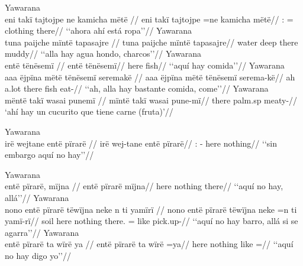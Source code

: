 \documentclass{memoir}
\begin{document}
\pex\label{ex-main-aff-part-nsubj}    \a Yawarana\\
    \label{convcosnoind-48}        \begingl
        \glpreamble eni takï tajtojpe ne kamicha mëtë //
        \gla eni takï tajtojpe =ne kamicha mëtë//
        \glb {}:   = clothing there//
            \glft ‘‘ahora ahí está ropa’’//  
        \endgl 
    \a Yawarana\\
    \label{histgrme-76}        \begingl
        \glpreamble tuna paijche mïntë tapasajre //
        \gla tuna paijche mïntë tapasajre//
        \glb water deep there muddy//
            \glft ‘‘alla hay agua hondo, charcos’’//  
        \endgl 
    \a Yawarana\\
    \label{histgrme-86}        \begingl
        \glpreamble entë tënësemï //
        \gla entë tënësemï//
        \glb here fish//
            \glft ‘‘aquí hay comida’’//  
        \endgl 
    \a Yawarana\\
    \label{histgrme-89}        \begingl
        \glpreamble aaa ëjpïna mëtë tënësemï seremakë //
        \gla aaa ëjpïna mëtë tënësemï serema-kë//
        \glb ah a.lot there fish eat-//
            \glft ‘‘ah, alla hay bastante comida, come’’//  
        \endgl 
    \a Yawarana\\
    \label{ctorosq-116}        \begingl
        \glpreamble mëntë takï wasai punemï //
        \gla mïntë takï wasai pune-mï//
        \glb there  palm.sp meaty-//
            \glft ‘ahí hay un cucurito que tiene carne (fruta)’//  
        \endgl 
\xe

\ex Yawarana \\
\label{ex-main-neg-part-pirare-cop-nsubj}    \begingl
    \glpreamble irë wejtane entë pïrarë //
    \gla irë wej-tane entë pïrarë//
    \glb {}: - here nothing//
        \glft ‘‘sin embargo aquí no hay’’//  
    \endgl 
\xe

\pex\label{ex-main-neg-part-pirare-nsubj}    \a Yawarana\\
    \label{convinsectmaj-18}        \begingl
        \glpreamble entë pïrarë, mïjna //
        \gla entë pïrarë mïjna//
        \glb here nothing there//
            \glft ‘‘aquí no hay, allá’’//  
        \endgl 
    \a Yawarana\\
    \label{histyarirdi-823}        \begingl
        \glpreamble nono entë pïrarë tëwïjna neke n ti yamïrï //
        \gla nono entë pïrarë tëwïjna neke =n ti yamï-rï//
        \glb soil here nothing there.  = like pick.up-//
            \glft ‘‘aquí no hay barro, allá si se agarra’’//  
        \endgl 
    \a Yawarana\\
    \label{histyarirdi-824}        \begingl
        \glpreamble entë pïrarë ta wïrë ya //
        \gla entë pïrarë ta wïrë =ya//
        \glb here nothing like  =//
            \glft ‘‘aquí no hay digo yo’’//  
        \endgl 
\xe
\end{document}
